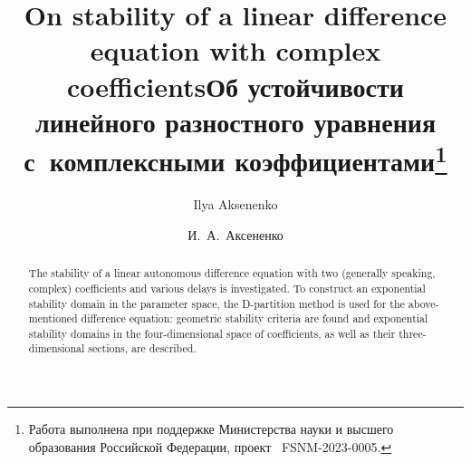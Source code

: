 \begin{englishtitle} 
\title{On stability of a linear difference equation with complex coefficients}

\author{Ilya Aksenenko}


\maketitle

\begin{abstract}
The stability of a linear autonomous difference equation with two (generally speaking, complex) coefficients and various delays is investigated. To construct an exponential stability domain in the parameter space, the D-partition method is used for the above-mentioned difference equation: geometric stability criteria are found and exponential stability domains in the four-dimensional space of coefficients, as well as their three-dimensional sections, are described.

\end{abstract}
\end{englishtitle}

\iffalse

\documentclass[12pt]{llncs}  
\usepackage{iftex}
\ifPDFTeX
\usepackage[T2A]{fontenc}
\usepackage[utf8]{inputenc} 
\usepackage[english,russian]{babel}
\fi
\usepackage{todonotes} 
\usepackage[russian]{nla}

\renewcommand{\Re}{\mathop{\rm Re}\nolimits}
\renewcommand{\Im}{\mathop{\rm Im}\nolimits}



\fi

\title{Об устойчивости линейного разностного уравнения с~комплексными коэффициентами\thanks{Работа выполнена при поддержке Министерства науки и высшего образования Российской Федерации, проект \textnumero~FSNM-2023-0005.}}
\author{И.~А.~Аксененко}


\maketitle

